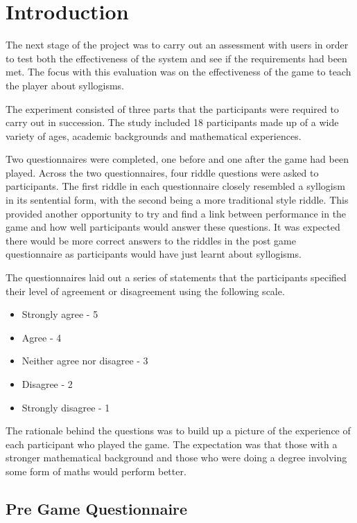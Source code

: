 \documentclass[12pt,a4paper]{report}
\begin{document}
\section{Introduction}
The next stage of the project was to carry out an assessment with users in order to test both the effectiveness of the system and see if the requirements had been met. The focus with this evaluation was on the effectiveness of the game to teach the player about syllogisms.

The experiment consisted of three parts that the participants were required to carry out in succession. The study included 18 participants made up of a wide variety of ages, academic backgrounds and mathematical experiences. 

Two questionnaires were completed, one before and one after the game had been played. Across the two questionnaires, four riddle questions were asked to participants. The first riddle in each questionnaire closely resembled a syllogism in its sentential form, with the second being a more traditional style riddle. This provided another opportunity to try and find a link between performance in the game and how well participants would answer these questions. It was expected there would be more correct answers to the riddles in the post game questionnaire as participants would have just learnt about syllogisms. 


The questionnaires laid out a series of statements that the participants specified their level of agreement or disagreement using the following scale. 

\begin{itemize}
	\item Strongly agree - 5
	\item Agree - 4
	\item Neither agree nor disagree - 3
	\item Disagree - 2
	\item Strongly disagree - 1
\end{itemize}	

The rationale behind the questions was to build up a picture of the experience of each participant who played the game. The expectation was that those with a stronger mathematical background and those who were doing a degree involving some form of maths would perform better. 

\subsection{Pre Game Questionnaire}
\end{document}
